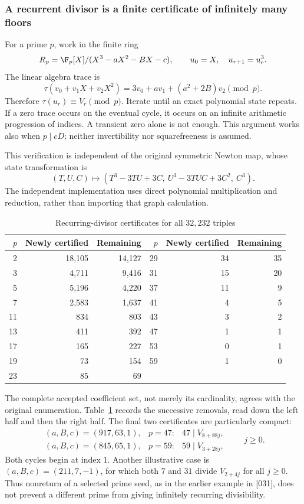 \documentclass[11pt,a4paper]{article}
\theoremstyle{definition}\newtheorem{definition}[theorem]{Definition}
\theoremstyle{remark}\newtheorem{remark}[theorem]{Remark}
\begin{document}
\subsubsection{A recurrent divisor is a finite certificate of infinitely many floors}

For a prime $p$, work in the finite ring
\[
 R_p=\F_p[X]/(X^3-aX^2-BX-c),\qquad
 u_0=X,\quad u_{r+1}=u_r^3.
\]
The linear algebra trace is
\begin{equation}\label{R03:eq:tau-real}
 \tau(v_0+v_1X+v_2X^2)=3v_0+av_1+(a^2+2B)v_2\pmod p.
\end{equation}
Therefore $\tau(u_r)\equiv V_r\pmod p$. Iterate until an exact
polynomial state repeats. If a zero trace occurs on the eventual
cycle, it occurs on an infinite arithmetic progression of indices.
A transient zero alone is not enough. This argument works also when
$p\mid cD$; neither invertibility nor squarefreeness is assumed.

This verification is independent of the original symmetric Newton
map, whose state transformation is
\[
 (T,U,C)\longmapsto
 (T^3-3TU+3C,\ U^3-3TUC+3C^2,\ C^3).
\]
The independent implementation uses direct polynomial multiplication
and reduction, rather than importing that graph calculation.

\begin{table}[ht]
\centering
\caption{Recurring-divisor certificates for all $32,232$ triples}
\label{R03:tab:prime-counts}
\begin{tabular}{rrr@{\qquad}rrr}
\toprule
$p$ & Newly certified & Remaining & $p$ & Newly certified & Remaining\\
\midrule
2  &18,105&14,127 &29&34&35\\
3  &4,711&9,416 &31&15&20\\
5  &5,196&4,220 &37&11&9\\
7  &2,583&1,637 &41&4&5\\
11 &834&803 &43&3&2\\
13 &411&392 &47&1&1\\
17 &165&227 &53&0&1\\
19 &73&154 &59&1&0\\
23 &85&69 &&&\\
\bottomrule
\end{tabular}
\end{table}

The complete accepted coefficient set, not merely its cardinality,
agrees with the original enumeration. Table~\ref{R03:tab:prime-counts}
records the successive removals, read down the left half and then
the right half. The final two certificates are particularly compact:
\[
 \begin{array}{ccl}
 (a,B,c)=(917,63,1),&p=47:&47\mid V_{8+88j},\\
 (a,B,c)=(845,65,1),&p=59:&59\mid V_{3+28j},
 \end{array}\qquad j\ge0.
\]
Both cycles begin at index $1$. Another illustrative case is
$(a,B,c)=(211,7,-1)$, for which both $7$ and $31$ divide
$V_{2+4j}$ for all $j\ge0$. Thus nonreturn of a selected prime seed,
as in the earlier example in [031], does not prevent a different
prime from giving infinitely recurring divisibility.
\end{document}
